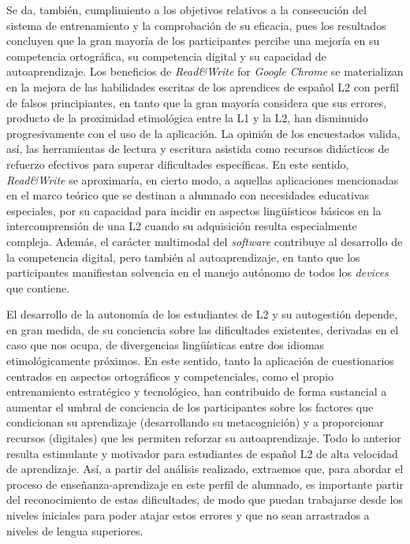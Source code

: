 \documentclass[spanish]{textolivre}
\begin{document}
Se da, también, cumplimiento a los objetivos relativos a la consecución del sistema de entrenamiento y la comprobación de su eficacia, pues los resultados concluyen que la gran mayoría de los participantes percibe una mejoría en su competencia ortográfica, su competencia digital y su capacidad de autoaprendizaje. Los beneficios de \textit{Read\&Write} for \textit{Google Chrome} se materializan en la mejora de las habilidades escritas de los aprendices de español L2 con perfil de falsos principiantes, en tanto que la gran mayoría considera que sus errores, producto de la proximidad etimológica entre la L1 y la L2, han disminuido progresivamente con el uso de la aplicación. La opinión de los encuestados valida, así, las herramientas de lectura y escritura asistida como recursos didácticos de refuerzo efectivos para superar dificultades específicas. En este sentido, \textit{Read\&Write} se aproximaría, en cierto modo, a aquellas aplicaciones mencionadas en el marco teórico que se destinan a alumnado con necesidades educativas especiales, por su capacidad para incidir en aspectos lingüísticos básicos en la intercomprensión de una L2 cuando su adquisición resulta especialmente compleja. Además, el carácter multimodal del \textit{software} contribuye al desarrollo de la competencia digital, pero también al autoaprendizaje, en tanto que los participantes manifiestan solvencia en el manejo autónomo de todos los \textit{devices} que contiene.

El desarrollo de la autonomía de los estudiantes de L2 y su autogestión depende, en gran medida, de su conciencia sobre las dificultades existentes, derivadas en el caso que nos ocupa, de divergencias lingüísticas entre dos idiomas etimológicamente próximos. En este sentido, tanto la aplicación de cuestionarios centrados en aspectos ortográficos y competenciales, como el propio entrenamiento estratégico y tecnológico, han contribuido de forma sustancial a aumentar el umbral de conciencia de los participantes sobre los factores que condicionan su aprendizaje (desarrollando su metacognición) y a proporcionar recursos (digitales) que les permiten reforzar su autoaprendizaje. Todo lo anterior resulta estimulante y motivador para estudiantes de español L2 de alta velocidad de aprendizaje. Así, a partir del análisis realizado, extraemos que, para abordar el proceso de enseñanza-aprendizaje en este perfil de alumnado, es importante partir del reconocimiento de estas dificultades, de modo que puedan trabajarse desde los niveles iniciales para poder atajar estos errores y que no sean arrastrados a niveles de lengua superiores.   
\end{document}
